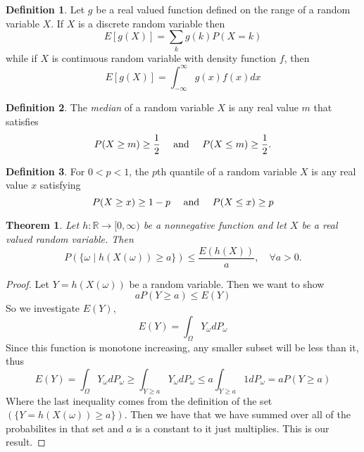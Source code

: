 \documentclass{article}
\newtheorem{theorem}{Theorem}[section]
\theoremstyle{definition}
\newtheorem{definition}{Definition}[section]
\theoremstyle{remark}
\begin{document}
\begin{definition}
Let $g$ be a real valued function defined on the range
of a random variable $X$. If $X$ is a discrete random variable then 
\[
E[g(X)] = \sum_k{g(k)P(X=k)}
\]
while if $X$ is continuous random variable with density function $f$, then
\[
E[g(X)] = \int_{-\infty}^{\infty}{g(x)f(x)dx}
\]
\end{definition}






\vspace{.5cm}




\begin{definition}
The \textit{median} of a random variable $X$ is any real value $m$
that satisfies \[
P(X \geq m) \geq \frac{1}{2} \quad \textnormal{ and } \quad 
P(X \leq m) \geq \frac{1}{2}.
\]
\end{definition}


\vspace{.5cm}




\begin{definition}
For $0 < p < 1$, the $p$th quantile of a random variable $X$ 
is any real value $x$ satisfying 
\[
P(X \geq x) \geq 1-p \quad \textnormal{ and } \quad P(X \leq x) \geq p
\]
\end{definition}


\vspace{.5cm}




\begin{theorem}
Let $h: \mathbb{R} \to [0,\infty)$ be a nonnegative function and let $X$ be a real valued random variable. Then 
\[
P(\{\omega \mid h(X(\omega)) \geq a\}) \leq \frac{E(h(X))}{a}, \quad \forall a > 0.
\]
\end{theorem}

\begin{proof}
Let $Y = h(X(\omega))$ be a random variable. 
Then we want to show \[
aP(Y \geq a) \leq E(Y)
\]
So we investigate $E(Y)$, 
\[
E(Y) = \int_\Omega Y_\omega dP_\omega 
\]
Since this function is monotone increasing, any smaller subset will
be less than it, thus
\[
E(Y) = \int_\Omega Y_\omega dP_\omega  \geq \int_{Y\geq a} Y_\omega dP_\omega \leq a \int_{Y \geq a} 1 dP_\omega = aP({Y \geq a})
\]
Where the last inequality comes from the definition of the set $(\{Y = h(X(\omega)) \geq a\})$. Then we 
have that we have summed over all of the probabilites in that set and $a$ is a constant to it just multiplies. This is our result. 
\end{proof}
\end{document}
